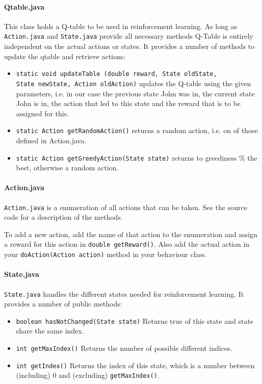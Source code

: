 \documentclass[a4paper,10pt]{scrartcl}
\begin{document}
\paragraph{Qtable.java}
This class holds a Q-table to be used in reinforcement learning. As long as \verb|Action.java| and \verb|State.java| provide all necessary methods Q-Table is entirely independent on the actual actions or states. It provides a number of methods to update the qtable and retrieve actions:

\begin{itemize}
 \item \verb|static void updateTable (double reward, State oldState,|\\
  \verb|State newState, Action oldAction)| updates the Q-table using the given parameters, i.e. in our case the previous state John was in, the current state John is in, the action that led to this state and the reward that is to be assigned for this.
 \item \verb|static Action getRandomAction()| returns a random action, i.e. on of those defined in Action.java.
 \item \verb|static Action getGreedyAction(State state)| returns to  greediness \% the best, otherwise a random action.
\end{itemize}

\paragraph{Action.java}
\verb|Action.java| is a enumeration of all actions that can be taken. See the source code for a description of the methods.

To add a new action, add the name of that action to the enumeration and assign a reward for this action in \verb|double getReward()|. Also add the actual action in your \verb|doAction(Action action)| method in your behaviour class.

\paragraph{State.java}
\verb|State.java| handles the different states needed for reinforcement learning. It provides a number of public methods:
\begin{itemize}
 \item \verb|boolean hasNotChanged(State state)| Returns true of this state and state share the same index.
 \item \verb|int getMaxIndex()| Returns the number of possible different indices.
 \item \verb|int getIndex()| Returns the index of this state, which is a number between (including) 0 and (excluding) \verb|getMaxIndex()|.
\end{itemize} 
\end{document}

